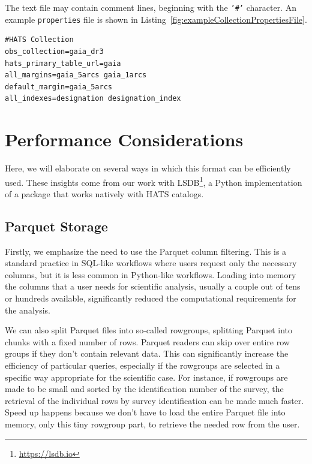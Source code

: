 \documentclass[11pt,a4paper]{ivoa}
\begin{document}
The text file may contain comment lines, beginning with the \texttt{'\#'} character.
An example \texttt{properties} file is shown in Listing~\ref{fig:exampleCollectionPropertiesFile}.

\begin{minipage}{\linewidth}
\begin{lstlisting}[caption=Example \texttt{collection.properties} file contents, label=fig:exampleCollectionPropertiesFile]
#HATS Collection
obs_collection=gaia_dr3
hats_primary_table_url=gaia
all_margins=gaia_5arcs gaia_1arcs
default_margin=gaia_5arcs
all_indexes=designation designation_index
\end{lstlisting}
\end{minipage}

\section{Performance Considerations}
Here, we will elaborate on several ways in which this format can be efficiently used. These insights come from our work with LSDB\footnote{\url{https://lsdb.io}}, a Python implementation of a package that works natively with HATS catalogs. \par

\subsection{Parquet Storage}\label{sec:parquetPerformance}
Firstly, we emphasize the need to use the Parquet column filtering. 
This is a standard practice in SQL-like workflows where users request only the necessary columns, but it is less common in Python-like workflows. 
Loading into memory the columns that a user needs for scientific analysis, usually a couple out of tens or hundreds available, significantly reduced the computational requirements for the analysis.  \par 
We can also split Parquet files into so-called rowgroups, splitting Parquet into chunks with a fixed number of rows. 
Parquet readers can skip over entire row groups if they don't contain relevant data. 
This can significantly increase the efficiency of particular queries, especially if the rowgroups are selected in a specific way appropriate for the scientific case. 
For instance, if rowgroups are made to be small and sorted by the identification number of the survey, the retrieval of the individual rows by survey identification can be made much faster. 
Speed up happens because we don't have to load the entire Parquet file into memory, only this tiny rowgroup part, to retrieve the needed row from the user. \par 
\end{document}

